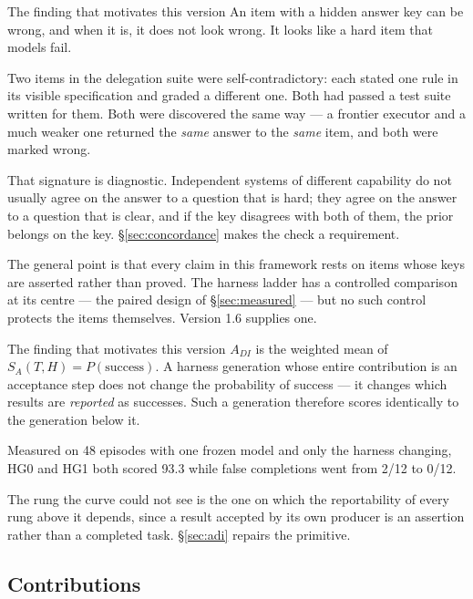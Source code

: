\documentclass[11pt]{article}
\theoremstyle{definition}
\newcommand{\SA}{\ensuremath{S_A(T,H)}}
\begin{document}
\begin{cautionbox}{The finding that motivates this version}
An item with a hidden answer key can be wrong, and when it is, it does not look wrong. It looks like a hard item that models fail.

Two items in the delegation suite were self-contradictory: each stated one rule in its visible specification and graded a different one. Both had passed a test suite written for them. Both were discovered the same way --- a frontier executor and a much weaker one returned the \emph{same} answer to the \emph{same} item, and both were marked wrong.

That signature is diagnostic. Independent systems of different capability do not usually agree on the answer to a question that is hard; they agree on the answer to a question that is clear, and if the key disagrees with both of them, the prior belongs on the key. \S\ref{sec:concordance} makes the check a requirement.
\end{cautionbox}

The general point is that every claim in this framework rests on items whose keys are asserted rather than proved. The harness ladder has a controlled comparison at its centre --- the paired design of \S\ref{sec:measured} --- but no such control protects the items themselves. Version 1.6 supplies one.

\begin{cautionbox}{The finding that motivates this version}
$A_{DI}$ is the weighted mean of $\SA{} = P(\text{success})$. A harness generation whose entire contribution is an acceptance step does not change the probability of success --- it changes which results are \emph{reported} as successes. Such a generation therefore scores identically to the generation below it.

Measured on 48 episodes with one frozen model and only the harness changing, HG0 and HG1 both scored 93.3 while false completions went from 2/12 to 0/12.

The rung the curve could not see is the one on which the reportability of every rung above it depends, since a result accepted by its own producer is an assertion rather than a completed task. \S\ref{sec:adi} repairs the primitive.
\end{cautionbox}

\subsection{Contributions}
\end{document}
